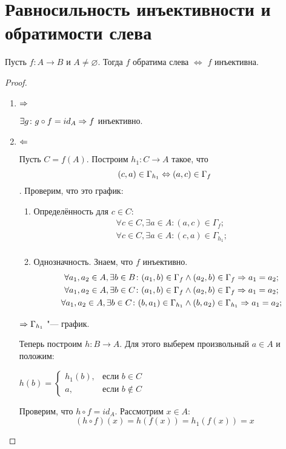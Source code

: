 ﻿\section{Равносильность инъективности и обратимости слева}

\begin{theorem}{}
Пусть $f:A \to B$ и $A \ne \varnothing$. Тогда $f$ обратима слева $\iff$ $f$ инъективна.
\end{theorem}

\begin{proof}
\begin{enumerate}
\item $\Rightarrow$

$\exists g \colon g \circ f = id_A \Rightarrow f$ инъективно.

\item $\Leftarrow$

Пусть $C = f(A)$. Построим $h_1: C \to A$ такое, что
\[(c, a) \in \Gamma_{h_1} \Leftrightarrow (a, c) \in \Gamma_{f}\]. Проверим, что это график:

\begin{enumerate}
\item Определённость для $c \in C$:
\begin{gather*}
\forall c \in C, \exists a \in A \colon (a, c) \in \Gamma_{f}; \\
\forall c \in C, \exists a \in A \colon (c, a) \in \Gamma_{h_1}; \\
\end{gather*}
\item Однозначность. Знаем, что $f$ инъективно. 
\begin{gather*}
\forall a_1, a_2 \in A, \exists b \in B \colon (a_1, b) \in \Gamma_{f} \wedge (a_2, b)\in \Gamma_{f} \Rightarrow a_1 = a_2; \\
\forall a_1, a_2 \in A, \exists b \in C \colon (a_1, b) \in \Gamma_{f} \wedge (a_2, b)\in \Gamma_{f} \Rightarrow a_1 = a_2; \\
\forall a_1, a_2 \in A, \exists b \in C \colon (b, a_1) \in \Gamma_{h_1} \wedge (b, a_2)\in \Gamma_{h_1} \Rightarrow a_1 = a_2;
\end{gather*}
\end{enumerate}

$\Rightarrow \Gamma_{h_1}$ "--- график.

Теперь построим $h: B \to A$. Для этого выберем произвольный $a \in A$ и положим:

$h(b) = \begin{cases} h_1(b), & \text{если~} b \in C\\ a, &\text{если~} b \notin C\end{cases}$

Проверим, что $h \circ f = id_A$. Рассмотрим $x \in A$:
\[(h \circ f)(x) = h(f(x)) = h_1(f(x)) = x\]
\end{enumerate}
\end{proof}
